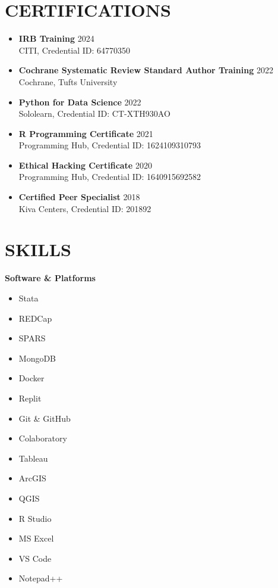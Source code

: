 \documentclass[a4paper,12pt]{article}
\begin{document}
{\section{CERTIFICATIONS}
\begin{itemize}
    \item \textbf{IRB Training} \hfill 2024 \\
    CITI, Credential ID: 64770350
    \item \textbf{Cochrane Systematic Review Standard Author Training} \hfill 2022 \\
    Cochrane, Tufts University
    \item \textbf{Python for Data Science} \hfill 2022 \\
    Sololearn, Credential ID: CT-XTH930AO
    \item \textbf{R Programming Certificate} \hfill 2021 \\
    Programming Hub, Credential ID: 1624109310793
    \item \textbf{Ethical Hacking Certificate} \hfill 2020 \\
    Programming Hub, Credential ID: 1640915692582
    \item \textbf{Certified Peer Specialist} \hfill 2018 \\
    Kiva Centers, Credential ID: 201892
\end{itemize}
\pagebreak
\section{SKILLS}
\begin{center}
\textbf{Software \& Platforms} \\
\end{center}
\begin{multicols}{4}
\begin{itemize}
  \item Stata
  \item REDCap
  \item SPARS
  \item MongoDB
  \item Docker
  \item Replit
  \item Git \& GitHub
  \item Colaboratory
  \item Tableau
  \item ArcGIS
  \item QGIS
  \item R Studio
  \item MS Excel
  \item VS Code
  \item Notepad++
\end{itemize}
\end{multicols}

}
\end{document}
